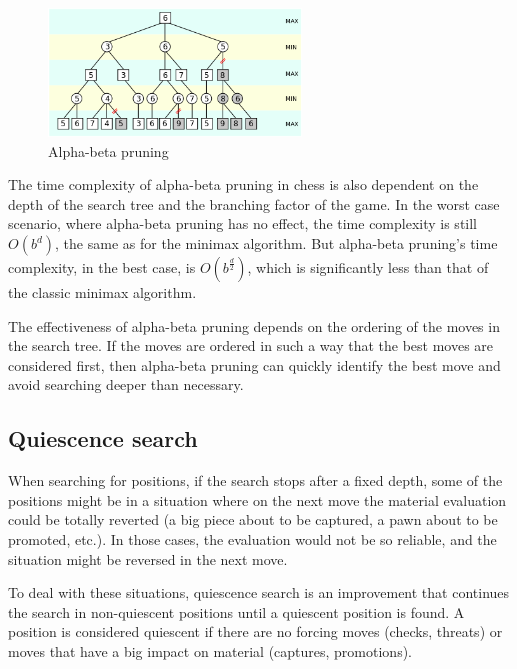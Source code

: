 \begin{figure}[h]
    \centering
    \includegraphics[width=0.6\textwidth]{figures/alpha-beta-pruning.png}
    \caption{Alpha-beta pruning \cite{alpha-beta-pruning}}
    \label{fig:alphaBetaPruning}
\end{figure}

The time complexity of alpha-beta pruning in chess is also dependent on the depth of the search tree and the branching factor of the game. In the worst case scenario, where alpha-beta pruning has no effect, the time complexity is still $O(b^{d})$, the same as for the minimax algorithm. But alpha-beta pruning's time complexity, in the best case, is $O(b^{\frac{d}{2}})$, which is significantly less than that of the classic minimax algorithm.

The effectiveness of alpha-beta pruning depends on the ordering of the moves in the search tree. If the moves are ordered in such a way that the best moves are considered first, then alpha-beta pruning can quickly identify the best move and avoid searching deeper than necessary.

\subsection{Quiescence search}
\label{subsec:ch2sec2subsec3}

When searching for positions, if the search stops after a fixed depth, some of the positions might be in a situation where on the next move the material evaluation could be totally reverted (a big piece about to be captured, a pawn about to be promoted, etc.). In those cases, the evaluation would not be so reliable, and the situation might be reversed in the next move.

To deal with these situations, quiescence search is an improvement that continues the search in non-quiescent positions until a quiescent position is found. A position is considered quiescent if there are no forcing moves (checks, threats) or moves that have a big impact on material (captures, promotions).


